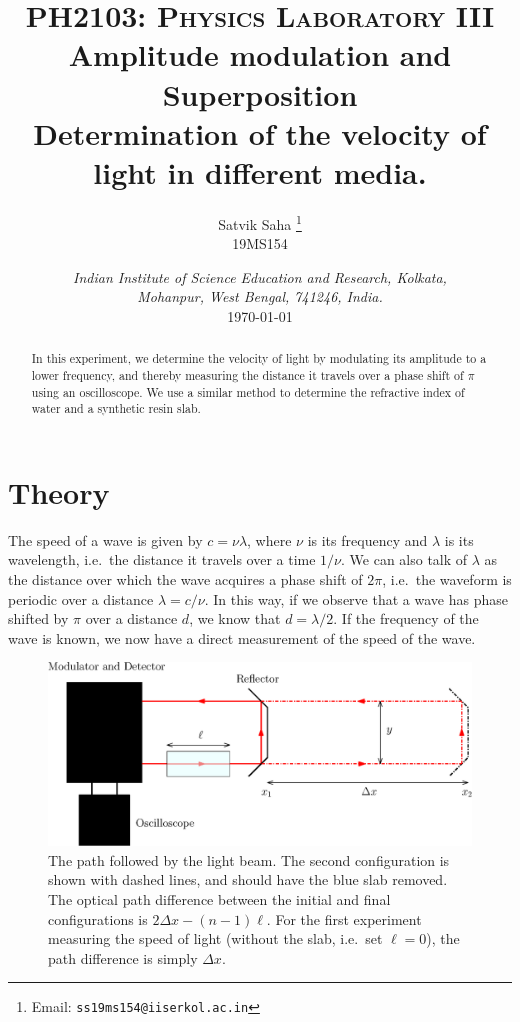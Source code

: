\documentclass[11pt]{article}
\title{
        \Large\textsc{PH2103: Physics Laboratory III} \\
        \vspace{10pt}
        \Huge \textbf{Amplitude modulation and Superposition} \\
        \vspace{5pt}
        \large{Determination of the velocity of light in different media.}
}
\author{
        \large Satvik Saha%
        \thanks{Email: \tt ss19ms154@iiserkol.ac.in}
        \\\textsc{\small 19MS154}
}
\date{\normalsize
        \textit{Indian Institute of Science Education and Research, Kolkata, \\
        Mohanpur, West Bengal, 741246, India.} \\
        \vspace{10pt}
        \today
}
\begin{document}
        \maketitle

        \begin{abstract}
                In this experiment, we determine the velocity of light by modulating its amplitude to a lower frequency, and 
                thereby measuring the distance it travels over a phase shift of $\pi$ using an oscilloscope.
                We use a similar method to determine the refractive index of water and a synthetic resin slab.
        \end{abstract}

        \section{Theory}
        
        The speed of a wave is given by $c = \nu\lambda$, where $\nu$ is its frequency and $\lambda$ is its wavelength, i.e.\ the distance it travels
        over a time $1 /\nu$. 
        We can also talk of $\lambda$ as the distance over which the wave acquires a phase shift of $2\pi$, i.e.\ the waveform is periodic over a 
        distance $\lambda = c /\nu$.
        In this way, if we observe that a wave has phase shifted by $\pi$ over a distance $d$,
        we know that $d = \lambda /2$. If the frequency of the wave is known, we now have a direct measurement of the speed of the wave.

        \begin{figure}
        \begin{center}
                \includegraphics[scale=0.8]{./oscill.eps}
        \end{center}
        \caption{The path followed by the light beam. The second configuration is shown with dashed lines, and should have the blue slab removed.
        The optical path difference between the initial and final configurations is $2\Delta x - (n - 1)\ell$. For the first experiment measuring 
        the speed of light (without the slab, i.e.\ set $\ell = 0$), the path difference is simply $\Delta x$.}
        \label{fig:oscill}
        \end{figure}
        
\end{document}
